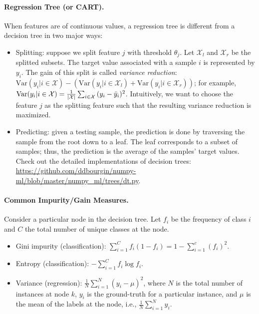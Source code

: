 {    \paragraph{Regression Tree (or CART).} 
    When features are of continuous values, a regression tree is different from a decision tree in two major ways:
        \begin{itemize}
            \item Splitting: suppose we split feature $j$ with threshold $\theta_j$.
            Let $\mathcal{X}_l$ and $\mathcal{X}_r$ be the splitted subsets. 
            The target value associated with a sample $i$ is represented by $y_i$.
            The gain of this split is called \emph{variance reduction}:
            $\text{Var}(y_i | i \in \mathcal{X}) - \left( \text{Var}(y_i | i \in \mathcal{X}_l) + \text{Var}(y_i | i \in \mathcal{X}_r) \right)$; for example, $\text{Var}(y_i | i \in \mathcal{X}) = \frac{1}{| \mathcal{X} |}\sum_{i \in \mathcal{X}}^{}{(y_i - \bar{y}_i)^2}$. Intuitively, we want to choose the feature $j$ as the splitting feature such that the resulting variance reduction is maximized.
            \item Predicting: given a testing sample, the prediction is done by traversing the sample from the root down to a leaf.
            The leaf corresponds to a subset of samples; thus, the prediction is the average of the samples' target values.
            Check out the detailed implementations of decision trees: \url{https://github.com/ddbourgin/numpy-ml/blob/master/numpy_ml/trees/dt.py}.
        \end{itemize}
        
    \paragraph{Common Impurity/Gain Measures.}
    Consider a particular node in the decision tree.
    Let $f_i$ be the frequency of class $i$ and $C$ the total number of unique classes at the node.
    \begin{itemize}
        \item Gini impurity (classification): $\sum_{i=1}^{C}{f_i (1 - f_i)} = 1 - \sum_{i=1}^{c}{(f_i)^2}$.
        \item Entropy (classification): $-\sum_{i=1}^{C}{f_i \log f_i}$.
        \item Variance (regression): $\frac{1}{N}\sum_{i=1}^{N}{(y_i - \mu)^2}$, where $N$ is the total number of instances at node $k$, $y_i$ is the ground-truth for a particular instance, and $\mu$ is the mean of the labels at the node, i.e., $\frac{1}{N}\sum_{i=1}^{N}{y_i}$.
    \end{itemize}
    
}
